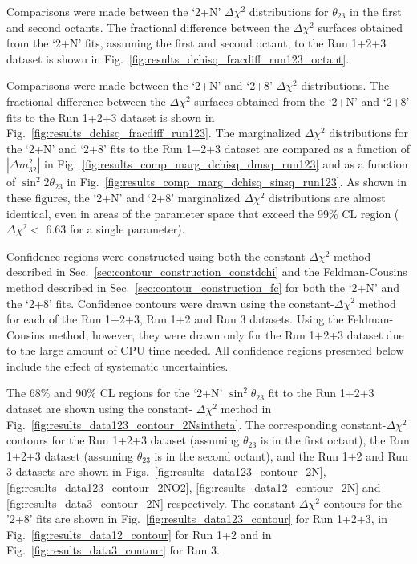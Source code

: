 Comparisons were made between the `2+N' $\Delta\chi^2$ distributions for $\theta_{23}$ in the first and second octants.
The fractional difference between the $\Delta\chi^2$ surfaces
obtained from the `2+N' fits, assuming the first and second octant, to the Run 1+2+3 dataset is shown in 
Fig.\ \ref{fig:results_dchisq_fracdiff_run123_octant}.

Comparisons were made between the `2+N' and `2+8' $\Delta\chi^2$ distributions.
The fractional difference between the $\Delta\chi^2$ surfaces
obtained from the `2+N' and `2+8' fits to the Run 1+2+3 dataset is shown in 
Fig.\ \ref{fig:results_dchisq_fracdiff_run123}. The marginalized $\Delta\chi^2$ distributions 
for the `2+N' and `2+8' fits to the Run 1+2+3 dataset are compared as a function of $|\Delta m^{2}_{32}|$ 
in Fig.\ \ref{fig:results_comp_marg_dchisq_dmsq_run123} and as a function of $\sin^{2}2\theta_{23}$ 
in Fig.\ \ref{fig:results_comp_marg_dchisq_sinsq_run123}. 
As shown in these figures, 
the `2+N' and `2+8' marginalized $\Delta\chi^2$ distributions are almost identical,
even  in areas of the parameter space that exceed the 99\% CL region 
($\Delta\chi^{2} < $ 6.63 for a single parameter).

Confidence regions were constructed using both the constant-$\Delta\chi^2$ method described in 
Sec.\ \ref{sec:contour_construction_constdchi} and the Feldman-Cousins method described in Sec.\ 
\ref{sec:contour_construction_fc} for both the `2+N' and the `2+8' fits. Confidence contours were 
drawn using the constant-$\Delta\chi^2$ method for each of the Run 1+2+3, Run 1+2 and Run 3 datasets. 
Using the Feldman-Cousins method, however, they were drawn only for the Run 1+2+3 dataset 
due to the large amount of CPU time needed.
All confidence regions presented below include the effect of systematic uncertainties.

The 68\% and 90\% CL regions for the `2+N' $\sin^2\theta_{23}$ fit to the Run 1+2+3 dataset are shown using the constant-
$\Delta\chi^2$ method in Fig.\ \ref{fig:results_data123_contour_2Nsintheta}.
The corresponding constant-$\Delta\chi^2$ contours for the
Run 1+2+3 dataset (assuming $\theta_{23}$ is in the first octant),
the Run 1+2+3 dataset (assuming $\theta_{23}$ is in the second octant),
and the Run 1+2 and Run 3 datasets are shown 
in Figs.\ \ref{fig:results_data123_contour_2N}, \ref{fig:results_data123_contour_2NO2},
\ref{fig:results_data12_contour_2N} and \ref{fig:results_data3_contour_2N} respectively. 
The constant-$\Delta\chi^2$ contours for the '2+8' fits 
are shown in Fig.\ \ref{fig:results_data123_contour} for Run 1+2+3, 
in Fig.\ \ref{fig:results_data12_contour} 
for Run 1+2 and in Fig.\ \ref{fig:results_data3_contour} for Run 3.

